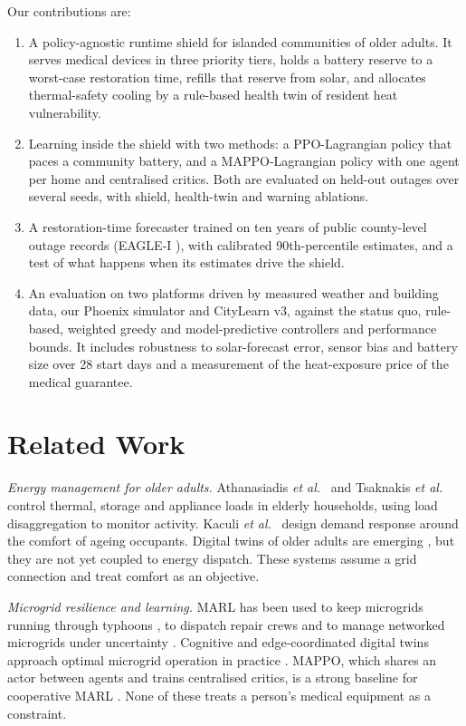 \documentclass[conference]{IEEEtran}
\begin{document}
Our contributions are:
\begin{enumerate}
\item A policy-agnostic runtime shield for islanded communities of older adults. It serves medical devices in three priority tiers, holds a battery reserve to a worst-case restoration time, refills that reserve from solar, and allocates thermal-safety cooling by a rule-based health twin of resident heat vulnerability.
\item Learning inside the shield with two methods: a PPO-Lagrangian policy that paces a community battery, and a MAPPO-Lagrangian policy with one agent per home and centralised critics. Both are evaluated on held-out outages over several seeds, with shield, health-twin and warning ablations.
\item A restoration-time forecaster trained on ten years of public county-level outage records (EAGLE-I \cite{brelsford2024eaglei}), with calibrated 90th-percentile estimates, and a test of what happens when its estimates drive the shield.
\item An evaluation on two platforms driven by measured weather and building data, our Phoenix simulator and CityLearn v3, against the status quo, rule-based, weighted greedy and model-predictive controllers and performance bounds. It includes robustness to solar-forecast error, sensor bias and battery size over 28 start days and a measurement of the heat-exposure price of the medical guarantee.
\end{enumerate}

\section{Related Work}
\textit{Energy management for older adults.} Athanasiadis \textit{et al.}\ \cite{athanasiadis2022sems} and Tsaknakis \textit{et al.}\ \cite{tsaknakis2023nearly} control thermal, storage and appliance loads in elderly households, using load disaggregation to monitor activity. Kaculi \textit{et al.}\ \cite{kaculi2025human} design demand response around the comfort of ageing occupants. Digital twins of older adults are emerging \cite{lehmann2024twins,momand2025twins}, but they are not yet coupled to energy dispatch. These systems assume a grid connection and treat comfort as an objective.

\textit{Microgrid resilience and learning.} MARL has been used to keep microgrids running through typhoons \cite{wu2026marl}, to dispatch repair crews \cite{qiu2023repair} and to manage networked microgrids under uncertainty \cite{esan2026lean}. Cognitive and edge-coordinated digital twins approach optimal microgrid operation in practice \cite{sivaneasan2025cognitive,vanitha2025cet}. MAPPO, which shares an actor between agents and trains centralised critics, is a strong baseline for cooperative MARL \cite{yu2022mappo}. None of these treats a person's medical equipment as a constraint.
\end{document}
